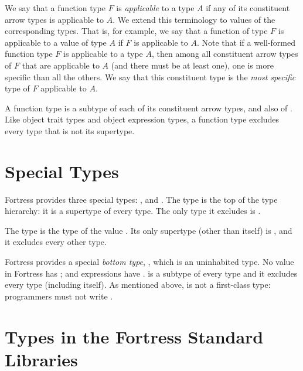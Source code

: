 We say that a function type $F$ is \emph{applicable} to a type $A$
if any of its constituent arrow types is applicable to $A$.
We extend this terminology to values of the corresponding types.
That is, for example,
we say that a function of type $F$ is applicable to a value of type $A$
if $F$ is applicable to $A$.
Note that if a well-formed function type $F$ is applicable to a type $A$,
then among all constituent arrow types of $F$ that are applicable to $A$
(and there must be at least one),
one is more specific than all the others.
We say that this constituent type is the \emph{most specific} type of $F$
applicable to $A$.

A function type is a subtype of each of its constituent arrow types,
and also of .
Like object trait types and object expression types,
a function type excludes every type that is not its supertype.


\section{Special Types}

Fortress provides three special types: ,  and \TYP{()}.
The type  is the top of the type hierarchy:
it is a supertype of every type.
The only type it excludes is .

The type \TYP{()} is the type of the value \EXP{()}.
Its only supertype (other than itself) is ,
and it excludes every other type.

Fortress provides a special \emph{bottom type}, ,
which is an uninhabited type.
No value in Fortress has ;
 and  expressions have .
 is a subtype of every type and
it excludes every type (including itself).
As mentioned above,  is not a first-class type:
programmers must not write .


\section{Types in the Fortress Standard Libraries}

